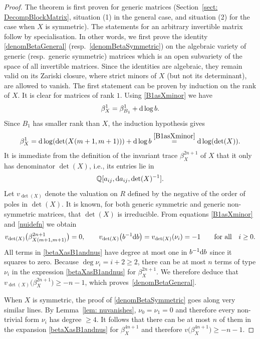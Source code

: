 \documentclass[pdftex]{sigma}%
\numberwithin{equation}{section}
\newcommand{\Q}{\mathbb Q}
\newcommand{\0}{\color{blue}{\mathsf{0}}}
\begin{document}
\begin{proof}
The theorem is first proven for generic matrices (Section~\ref{sect: DecompBlockMatrix}, situation (1) in the general case, and situation (2) for the case when $X$ is symmetric). The statements for an arbitrary invertible matrix follow by specialisation. In other words, we first prove the identity \eqref{denomBetaGeneral} (resp.~\eqref{denomBetaSymmetric}) on the algebraic variety of generic (resp.~generic symmetric) matrices which is an open subvariety of the space of all invertible matrices. Since the identities are algebraic, they remain valid on its Zariski closure, where strict minors of $X$ (but not its determinant), are allowed to vanish.
The first statement can be proven by induction on the rank of $X$. It is clear for matrices of rank $1$. Using \eqref{B1asXminor} we have
\begin{gather*}
\beta^1_X = \beta^1_{B_1} + {\rm d} \log b.
\end{gather*}
Since $B_1 $ has smaller rank than $X$, the induction hypothesis gives
\begin{gather*}
\beta^1_X = {\rm d} \log (\det(X(m+1,m+1))) + {\rm d}\log b \overset{\eqref{B1asXminor}}{=} {\rm d}\log (\det(X)).
\end{gather*}
 It is immediate from the definition of the invariant trace $\beta^{2n+1}_X$ of $X$ that it only has denominator $\det(X)$, i.e., its entries lie in
\begin{gather*}
\Q[a_{ij}, {\rm d} a_{ij} , \det(X)^{-1}] .
\end{gather*}
 Let $v_{\det(X)}$ denote the valuation on $R$ defined by the negative of the order of poles in $\det(X)$. It is known, for both generic symmetric and generic non-symmetric matrices, that $\det(X)$ is irreducible. From equations \eqref{B1asXminor} and \eqref{nuidefn} we obtain
\begin{gather*}
v_{\det(X)} \big(\beta^{2n+1}_{X(m+1,m+1)}\big) =0, \qquad
v_{\det(X)} \big(b^{-1} {\rm d}b\big) = v_{\det(X)} (\nu_i) =-1 \qquad \text{for all} \quad i\geq 0.
\end{gather*}
 All terms in \eqref{betaXasB1andnus} have degree at most one in $b^{-1} {\rm d}b$ since it squares to zero. Because $\deg \nu_i =i+2 \geq 2$, there can be at most $n$ terms of type $\nu_i$ in the expression \eqref{betaXasB1andnus} for $\beta_X^{2n+1}$. We therefore deduce that $v_{\det(X)}\big(\beta^{2n+1}_X\big) \geq -n-1$, which proves~\eqref{denomBetaGeneral}.

 When $X$ is symmetric, the proof of \eqref{denomBetaSymmetric} goes along very similar lines. By Lemma~\ref{lem: nuvanishes}, $\nu_0 =\nu_1=0$ and therefore every non-trivial form $\nu_i$ has degree $\geq 4$. It follows that there can be at most $n$ of them in the expansion \eqref{betaXasB1andnus} for $\beta_X^{4n+1}$ and therefore $v\big(\beta^{4n+1}_X\big) \geq - n-1$.
 \end{proof}
\end{document}
